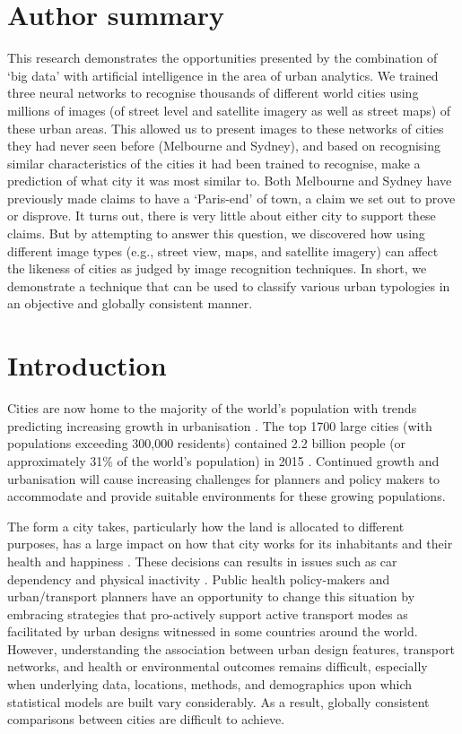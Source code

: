 \documentclass[10pt,letterpaper,hidelinks]{article}
\begin{document}
\section*{Author summary}
This research demonstrates the opportunities presented by the combination of `big data' with artificial intelligence in the area of urban analytics. We trained three neural networks to recognise thousands of different world cities using millions of images (of street level and satellite imagery as well as street maps) of these urban areas. This allowed us to present images to these networks of cities they had never seen before (Melbourne and Sydney), and based on recognising similar characteristics of the cities it had been trained to recognise, make a prediction of what city it was most similar to. Both Melbourne and Sydney have previously made claims to have a `Paris-end' of town, a claim we set out to prove or disprove. It turns out, there is very little about either city to support these claims. But by attempting to answer this question, we discovered how using different image types (e.g., street view, maps, and satellite imagery) can affect the likeness of cities as judged by image recognition techniques. In short, we demonstrate a technique that can be used to classify various urban typologies in an objective and globally consistent manner.



\linenumbers



\section*{Introduction}\label{sec:introduction}

Cities are now home to the majority of the world's population with trends predicting increasing growth in urbanisation \cite{UNDESA2015,WHO2016,ABS2008}. The top 1700 large cities (with populations exceeding 300,000 residents) contained 2.2 billion people (or approximately 31\% of the world's population) in 2015 \cite{UN2014}. Continued growth and urbanisation will cause increasing challenges for planners and policy makers to accommodate and provide suitable environments for these growing populations.

The form a city takes, particularly how the land is allocated to different purposes, has a large impact on how that city works for its inhabitants and their health and happiness \cite{Giles-corti2016,Kleinert2016,Goenka2016,Zapata-Diomedi2017}. These decisions can results in issues such as car dependency \cite{Heesch2014,Daley2011} and physical inactivity \cite{Cepeda2016,MingWen2008,Norman2006}. Public health policy-makers and urban/transport planners have an opportunity to change this situation by embracing strategies that pro-actively support active transport modes as facilitated by urban designs witnessed in some countries around the world. However, understanding the association between urban design features, transport networks, and health or environmental outcomes remains difficult, especially when underlying data, locations, methods, and demographics upon which statistical models are built vary considerably. As a result, globally consistent comparisons between cities are difficult to achieve. 
\end{document}
